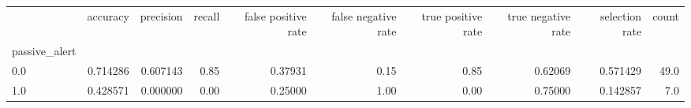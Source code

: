 \begin{tabular}{lrrrrrrrrr}
\toprule
{} &  accuracy &  precision &  recall &  false positive rate &  false negative rate &  true positive rate &  true negative rate &  selection rate &  count \\
passive\_alert &           &            &         &                      &                      &                     &                     &                 &        \\
\midrule
0.0           &  0.714286 &   0.607143 &    0.85 &              0.37931 &                 0.15 &                0.85 &             0.62069 &        0.571429 &   49.0 \\
1.0           &  0.428571 &   0.000000 &    0.00 &              0.25000 &                 1.00 &                0.00 &             0.75000 &        0.142857 &    7.0 \\
\bottomrule
\end{tabular}
